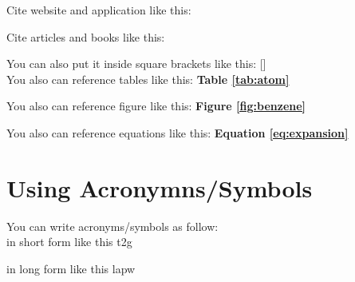 Cite website and application like this: \hspace{1cm}
\cite{williams_gnuplot_nodate}

Cite articles and books like this: \hspace{1cm}
\cite{hohenberg1964inhomogeneous}

You can also put it inside square brackets like this: \hspace{1cm}
[\cite{hohenberg1964inhomogeneous}]   \\

You also can reference tables like this: \hspace{1cm} 
\textbf{Table \ref{tab:atom}}


You also can reference figure like this: \hspace{1cm} 
\textbf{Figure \ref{fig:benzene}}


You also can reference equations like this: \hspace{1cm} 
\textbf{Equation \ref{eq:expansion}} \\

\section{Using Acronymns/Symbols}

You can write acronyms/symbols as follow: \\

in short form like this \hspace{1cm}
\acs{t2g}

in long form like this \hspace{1cm}
\acl{lapw}
















